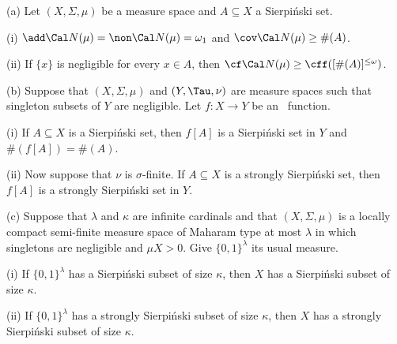  (a) Let $(X,\Sigma,\mu)$
be a measure space and $A\subseteq X$ a Sierpi\'nski set.

\quad(i) $\add\Cal N(\mu)=\non\Cal N(\mu)=\omega_1$
and $\cov\Cal N(\mu)\ge\#(A)$.

\quad(ii) If $\{x\}$ is negligible for every $x\in A$, then
$\cf\Cal N(\mu)\ge\cff([\#(A)]^{\le\omega})$.

(b) Suppose that $(X,\Sigma,\mu)$ and $(Y,\Tau,\nu)$ are measure spaces
such that singleton subsets of $Y$ are negligible.   Let
$f:X\to Y$ be an \imp\ function.

\quad(i) If $A\subseteq X$ is a Sierpi\'nski set, then $f[A]$ is a
Sierpi\'nski set in $Y$ and $\#(f[A])=\#(A)$.

\quad(ii) Now suppose that $\nu$ is $\sigma$-finite.
If $A\subseteq X$ is a strongly Sierpi\'nski set, then $f[A]$ is a
strongly Sierpi\'nski set in $Y$.

(c) Suppose that $\lambda$ and $\kappa$ are infinite cardinals and that
$(X,\Sigma,\mu)$ is a locally compact semi-finite measure space of Maharam
type at most $\lambda$ in which singletons are negligible and $\mu X>0$.
Give $\{0,1\}^{\lambda}$ its usual measure.

\quad(i) If $\{0,1\}^{\lambda}$ has a
Sierpi\'nski subset of size $\kappa$, then $X$ has a
Sierpi\'nski subset of size $\kappa$.

\quad(ii) If $\{0,1\}^{\lambda}$ has a
strongly Sierpi\'nski subset of size $\kappa$, then $X$ has a
strongly Sierpi\'nski subset of size $\kappa$.

